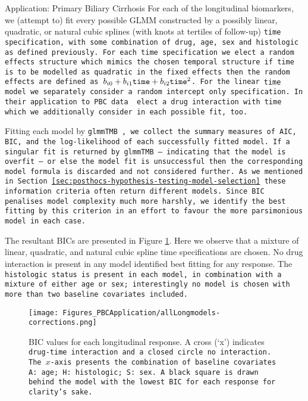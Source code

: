 \begin{chapter}{\label{cha:app-PBC}Application: Primary Biliary Cirrhosis}
  For each of the longitudinal biomarkers, we (attempt to) fit every possible GLMM constructed by a possibly linear, quadratic, or natural cubic splines (with knots at tertiles of follow-up) \tt{time} specification, with some combination of \tt{drug}, \tt{age}, \tt{sex} and \tt{histologic} as defined previously. For each \tt{time} specification we elect a random effects structure which mimics the chosen temporal structure \ie if \tt{time} is to be modelled as quadratic in the fixed effects then the random effects are defined as $b_{i0} + b_{i1}\tt{time} + b_{i2}\tt{time}^2$. For the linear \tt{time} model we separately consider a random intercept only specification. In their application to PBC data \citet{Rustand2023} elect a \tt{drug} interaction with \tt{time} which we additionally consider in each possible fit, too.

  Fitting each model by \tt{glmmTMB} \citep{R-glmmTMB}, we collect the summary measures of AIC, BIC, and the log-likelihood of each successfully fitted model. If a singular fit is returned by \tt{glmmTMB} -- indicating that the model is overfit -- or else the model fit is unsuccessful then the corresponding model formula is discarded and not considered further. As we mentioned in Section \ref{sec:posthocs-hypothesis-testing-model-selection} these information criteria often return different models. Since BIC penalises model complexity much more harshly, we identify the best fitting by this criterion in an effort to favour the more parsimonious model in each case.

  The resultant BICs are presented in Figure \ref{fig:pbc-longitudinal-allmodels}. Here we observe that a mixture of linear, quadratic, and natural cubic spline time specifications are chosen. No drug interaction is present in any model identified best fitting for any response. The \tt{histologic} status is present in each model, in combination with a mixture of either \tt{age} or \tt{sex}; interestingly no model is chosen with more than two baseline covariates included.

  \begin{figure}[ht]
      \centering
      \texttt{[image: Figures\_PBCApplication/allLongmodels-corrections.png]}
      \caption{BIC values for each longitudinal response. A cross (`x') indicates \tt{drug}-\tt{time} interaction and a closed circle no interaction. The $x$-axis presents the combination of baseline covariates \tt{A}: \tt{age}; \tt{H}: \tt{histologic}; \tt{S}: \tt{sex}. A black square is drawn behind the model with the lowest BIC for each response for clarity's sake.}
      \label{fig:pbc-longitudinal-allmodels}
  \end{figure}
  

\end{chapter}
